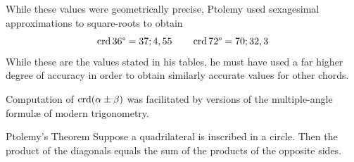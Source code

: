 While these values were geometrically precise, Ptolemy used sexagesimal approximations to square-roots to obtain
\[
	\crd\ang{36} =37;4,55\qquad \crd\ang{72}=70;32,3
\]
While these are the values stated in his tables, he must have used a far higher degree of accuracy in order to obtain similarly accurate values for other chords.
\goodbreak



Computation of $\crd(\alpha\pm\beta)$ was facilitated by versions of the multiple-angle formulæ of modern trigonometry.

\begin{thm*}{Ptolemy's Theorem}{}
	Suppose a quadrilateral is inscribed in a circle. Then the product of the diagonals equals the sum of the products of the opposite sides.\footnotemark
\end{thm*}\label{pg:ptolemythm}


